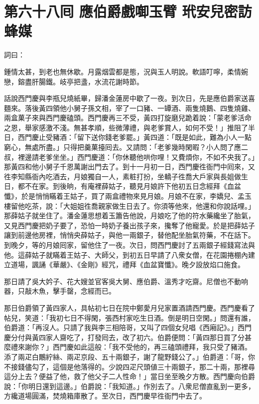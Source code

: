 
\chapter*{第六十八囘 應伯爵戲啣玉臂 玳安兒密訪蜂媒}


詞曰：

\begin{myquote} 
鍾情太甚，到老也無休歇。月露烟雲都是態，況與玉人明說。軟語叮嚀，柔情婉戀，鎔盡肝腸鐵。岐亭把盞，水流花謝時節。

\end{myquote} 

話說西門慶與李瓶兒燒紙畢，歸潘金蓮房中歇了一夜。到次日，先是應伯爵家送喜麵來。落後黃四領他小舅子孫文相，宰了一口豬、一罈酒、兩隻燒鵝、四隻燒雞、兩盒菓子來與西門慶磕頭。西門慶再三不受，黃四打旋磨兒跪着說：「蒙老爹活命之恩，舉家感激不淺。無甚孝順，些微薄禮，與老爹賞人，如何不受！」推阻了半日，西門慶止受豬酒：「留下送你錢老爹罷。」黃四道：「既是如此，難為小人一點窮心，無處所盡。」只得把羹菓擡囘去。又請問：「老爹幾時閑暇？小人問了應二叔，裡邊請老爹坐坐。」西門慶道：「你休聽他哄你哩！又費煩你，不如不央我了。」那黃四和他小舅子千恩萬謝出門去了。到十一月初一日，西門慶徃衙門中囘來，又徃李知縣衙內吃酒去，月娘獨自一人，素粧打扮，坐轎子徃喬大戶家與長姐做生日，都不在家。到後晌，有庵裡薛姑子，聽見月娘許下他初五日念經拜《血盆懺》，於是悄悄瞞着王姑子，買了兩盒禮物來見月娘。月娘不在家，李嬌兒、孟玉樓留他吃茶，說：「大姐姐徃喬親家做生日去了。你須等他來，他還和你說話哩。」那薛姑子就坐住了。潘金蓮思想着玉簫告他說，月娘吃了他的符水藥纔坐了胎氣，又見西門慶把奶子要了，恐怕一時奶子養出孩子來，攙奪了他寵愛。於是把薛姑子讓到前邊他房裡，悄悄央薛姑子，與他一兩銀子，替他配坐胎氣符藥，不在話下。到晚夕，等的月娘囘家，留他住了一夜。次日，問西門慶討了五兩銀子經錢寫法與他。這薛姑子就瞞着王姑子、大師父，到初五日早請了八衆女僧，在花園捲棚內建立道場，諷誦《華嚴》、《金剛》經咒，禮拜《血盆寶懺》。晚夕設放焰口施食。

那日請了吳大妗子、花大嫂並官客吳大舅、應伯爵、溫秀才吃齋。尼僧也不動响器，只敲木魚，擊手罄，念經而已。

那日伯爵領了黃四家人，具帖初七日在院中鄭愛月兒家置酒請西門慶。西門慶看了帖兒，笑道：「我初七日不得閑，張西村家吃生日酒。倒是明日空閑。」{}問還有誰，伯爵道：「再沒人。只請了我與李三相陪哥，又叫了四個女兒唱《西廂記》。」西門慶分付與黃四家人齋吃了，打發囘去，改了初六。伯爵便問：「黃四那日買了分甚麼禮來謝你？」西門慶如此這般：「我不受他的，再三磕頭禮拜，我只受了豬酒。添了兩疋白鷳紵絲、兩疋京段、五十兩銀子，謝了龍野錢公了。」伯爵道：「哥，你不接錢儘勾了，這個是他落得的。少說四疋尺頭値三十兩銀子，那二十兩，那裡尋這分上去？便益了他，救了他父子二人性命！」當日坐至晚夕方散。西門慶向伯爵說：「你明日還到這邊。」伯爵說：「我知道。」作別去了。八衆尼僧直亂到一更多，方纔道場圓滿，焚燒箱庫散了。至次日，西門慶早徃衙門中去了。

